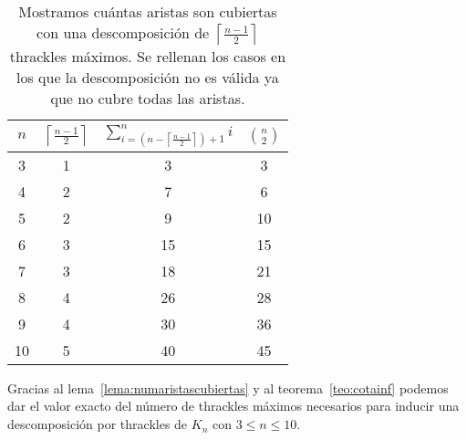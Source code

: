 \begin{table}[t]
  \centering
  \begin{tabular}{|c|c|c|c|}
    \hline
    $n$ & $\left\lceil\frac{n-1}{2}\right\rceil$ & $\sum^n_{i=\left(n-\left\lceil\frac{n-1}{2}\right\rceil\right) + 1}i$ & $\binom{n}{2}$\\[5pt] \hline\hline
    3   & 1  & 3 & 3 \\ \hline
    4   & 2  & 7 & 6 \\ \hline
    5   & 2  & \cellcolor{red!25}9 & 10 \\ \hline
    6   & 3  & 15 & 15 \\ \hline
    7   & 3  & \cellcolor{red!25}18 & 21 \\ \hline
    8   & 4  & \cellcolor{red!25}26 & 28 \\ \hline
    9   & 4  & \cellcolor{red!25}30 & 36 \\ \hline
    10  & 5  & \cellcolor{red!25}40 & 45 \\ \hline
  \end{tabular}
  \caption{ Mostramos cuántas aristas son cubiertas con una descomposición de $\left\lceil\frac{n-1}{2}\right\rceil$  thrackles
  máximos. Se rellenan los casos en los que la descomposición no es válida ya que no cubre todas las aristas. }
  \label{table:attrivialtight}
\end{table}

Gracias al lema~\ref{lema:numaristascubiertas} y al teorema~\ref{teo:cotainf} podemos
dar el valor exacto del número de thrackles máximos necesarios para inducir una
descomposición por thrackles de $K_n$ con $ 3\leq n \leq 10$.

%
%




